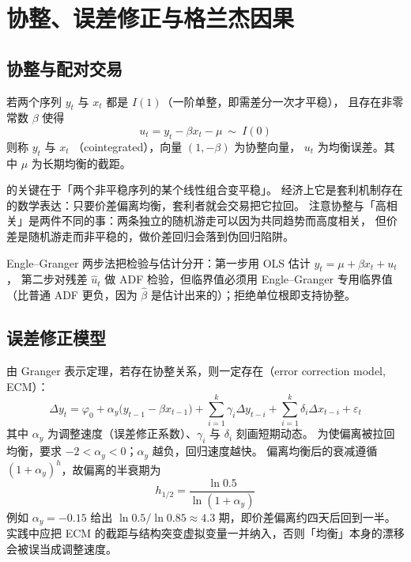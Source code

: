 \section{协整、误差修正与格兰杰因果}

\subsection{协整与配对交易}

\begin{definition}[协整]\label{def:09-cointegration}
若两个序列 $y_t$ 与 $x_t$ 都是 $I(1)$（一阶单整，即需差分一次才平稳），
且存在非零常数 $\beta$ 使得
\begin{equation}\label{eq:09-coint}
  u_t=y_t-\beta x_t-\mu\ \sim\ I(0)
\end{equation}
则称 $y_t$ 与 $x_t$ （cointegrated），向量 $(1,-\beta)$ 为协整向量，
$u_t$ 为均衡误差。其中 $\mu$ 为长期均衡的截距。
\end{definition}

 的关键在于「两个非平稳序列的某个线性组合变平稳」。
经济上它是套利机制存在的数学表达：只要价差偏离均衡，套利者就会交易把它拉回。
注意协整与「高相关」是两件不同的事：两条独立的随机游走可以因为共同趋势而高度相关，
但价差是随机游走而非平稳的，做价差回归会落到伪回归陷阱。

Engle--Granger 两步法把检验与估计分开：第一步用 OLS 估计 $y_t=\mu+\beta x_t+u_t$，
第二步对残差 $\hat u_t$ 做 ADF 检验，但临界值必须用 Engle--Granger 专用临界值
（比普通 ADF 更负，因为 $\hat\beta$ 是估计出来的）；拒绝单位根即支持协整。

\subsection{误差修正模型}

由 Granger 表示定理，若存在协整关系，则一定存在（error correction model, ECM）：
\begin{equation}\label{eq:09-ecm}
  \Delta y_t=\varphi_0+\alpha_y\bigl(y_{t-1}-\beta x_{t-1}\bigr)
  +\sum_{i=1}^{k}\gamma_i\Delta y_{t-i}
  +\sum_{i=1}^{k}\delta_i\Delta x_{t-i}+\varepsilon_t
\end{equation}
其中 $\alpha_y$ 为调整速度（误差修正系数）、$\gamma_i$ 与 $\delta_i$ 刻画短期动态。
为使偏离被拉回均衡，要求 $-2<\alpha_y<0$；$\alpha_y$ 越负，回归速度越快。
偏离均衡后的衰减遵循 $(1+\alpha_y)^{h}$，故偏离的半衰期为
\begin{equation}\label{eq:09-ecm-halflife}
  h_{1/2}=\frac{\ln 0.5}{\ln(1+\alpha_y)}
\end{equation}
例如 $\alpha_y=-0.15$ 给出 $\ln 0.5/\ln 0.85\approx 4.3$ 期，即价差偏离约四天后回到一半。
实践中应把 ECM 的截距与结构突变虚拟变量一并纳入，否则「均衡」本身的漂移会被误当成调整速度。

